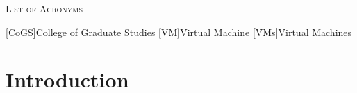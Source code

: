 \documentclass[12pt]{UIdahoMastersThesis}
\begin{document}






\begin{center}
	{\LARGE\textsc{List of Acronyms}}
\end{center}

\begin{acronym}[CoGS ]  %
    [CoGS]{College of Graduate Studies}
    [VM]{Virtual Machine}  %
    [VMs]{Virtual Machines}  %
\end{acronym}



\mainmatter  %
\setcounter{secnumdepth}{3}  %




\clearpage
\chapter{Introduction}
\label{Chapter:Introduction to Nuclear Renewable Hybrid Energy Systems}
\end{document}
